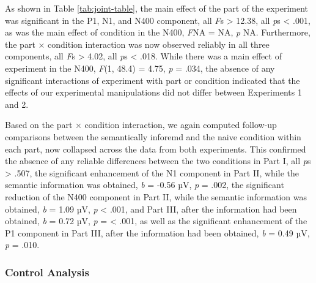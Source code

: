 \documentclass[
  english,
  man,11pt,floatsintext]{apa7}
\begin{document}
As shown in Table \ref{tab:joint-table}, the main effect of the part of the experiment was significant in the P1, N1, and N400 component, all \emph{F}s \textgreater{} 12.38, all \emph{p}s \textless{} .001, as was the main effect of condition in the N400, \emph{F}NA = NA, \emph{p} NA. Furthermore, the part × condition interaction was now observed reliably in all three components, all \emph{F}s \textgreater{} 4.02, all \emph{p}s \textless{} .018. While there was a main effect of experiment in the N400, \emph{F}(1, 48.4) = 4.75, \emph{p} = .034, the absence of any significant interactions of experiment with part or condition indicated that the effects of our experimental manipulations did not differ between Experiments 1 and 2.

Based on the part × condition interaction, we again computed follow-up comparisons between the semantically inforemd and the naive condition within each part, now collapsed across the data from both experiments. This confirmed the absence of any reliable differences between the two conditions in Part I, all \emph{p}s \textgreater{} .507, the significant enhancement of the N1 component in Part II, while the semantic information was obtained, \emph{b} = -0.56 µV, \emph{p} = .002, the significant reduction of the N400 component in Part II, while the semantic information was obtained, \emph{b} = 1.09 µV, \emph{p} \textless{} .001, and Part III, after the information had been obtained, \emph{b} = 0.72 µV, \emph{p} = \textless{} .001, as well as the significant enhancement of the P1 component in Part III, after the information had been obtained, \emph{b} = 0.49 µV, \emph{p} = .010.

\hypertarget{control-analysis}{%
\subsubsection{Control Analysis}\label{control-analysis}}
\end{document}
